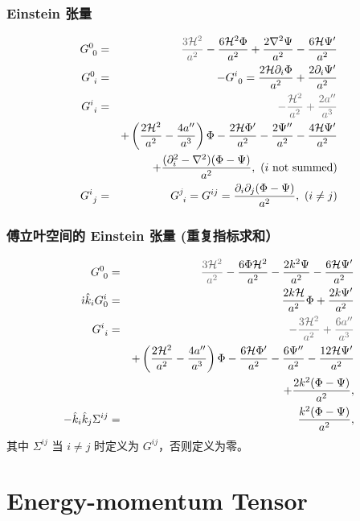 \documentclass[CJK,13pt]{beamer}
\begin{document}
  \begin{frame}
    \frametitle{Einstein 张量}
 \begin{eqnarray}
G^{0}_{\ 0} &=& {\gray \frac{3\mathcal{H}^2}{a^2 }} - \frac{6 \mathcal{H}^2  \Phi }{a^2 } + \frac{2 \nabla^2\Psi }{a^2 }  - \frac{6\mathcal{H}\Psi'}{a^2 } \\
G^{0}_{\ i} &=& - G^i_{\ 0} = \frac{2\mathcal{H}  {\partial_i} \Phi   }{a^2 } + \frac{2  {\partial_{i}} \Psi' }{a^2 }  \\
G^{i}_{\ i} &=& {\gray - \frac{\mathcal{H}^2}{a^2} + \frac{2 a''}{a^3 } } \nonumber \\
&& + \left(\frac{2\mathcal{H}^2}{a^2}- \frac{4 a''}{a^3 } \right)\Phi - \frac{2\mathcal{H} \Phi'}{a^2} - \frac{2 \Psi''}{a^2 }- \frac{4\mathcal{H}\Psi'}{a^2 } \nonumber \\
&&  + \frac{(\partial_i^2-\nabla^2) (\Phi-\Psi) }{a^2 } ,\ \text{($i$ not summed)} \\
G^{i}_{\ j} &=& G^{j}_{\ i} = G^{ij} =  \frac{ {\partial_i\partial_j} (\Phi-\Psi) }{a^2 } , \ (i\ne j)  \label{eq:shear}
 \end{eqnarray}
\end{frame}

  \begin{frame}
    \frametitle{傅立叶空间的 Einstein 张量 (重复指标求和）}
 \begin{eqnarray}
G^{0}_{\ 0} &=& {\gray \frac{3\mathcal{H}^2}{a^2 }} - \frac{6 \Phi  \mathcal{H}^2}{a^2 } - \frac{2k^2\Psi }{a^2 }  - \frac{6\mathcal{H}\Psi'}{a^2 } \\
\ii\hat{k}_i G^{i}_{0} &=&  \frac{2 k \mathcal{H} }{a^2 }\Phi + \frac{2 k \Psi' }{a^2 }  \\
G^{i}_{\ i} &=&  {\gray - \frac{3\mathcal{H}^2}{a^2} + \frac{6 {a''}}{a^3 } } \nonumber \\
&&  + \left(\frac{2\mathcal{H}^2}{a^2 }- \frac{4 {a''}}{a^3 } \right)\Phi - \frac{6\mathcal{H} \Phi'}{a^2 } - \frac{6 \Psi'' }{a^2 }- \frac{12\mathcal{H} \Psi'}{a^2 } \nonumber \\
&&  + \frac{2k^2 (\Phi-\Psi) }{a^2 } , \\
 -\hat{k}_i\hat{k}_j\Sigma^{ij} &=&  \frac{k^2(\Phi-\Psi)}{a^2 } ,
 \end{eqnarray}
 其中 $\Sigma^{ij}$ 当 $i\ne j$ 时定义为 $G^{ij}$，否则定义为零。
  \end{frame}

  \section{Energy-momentum Tensor}
\end{document}
